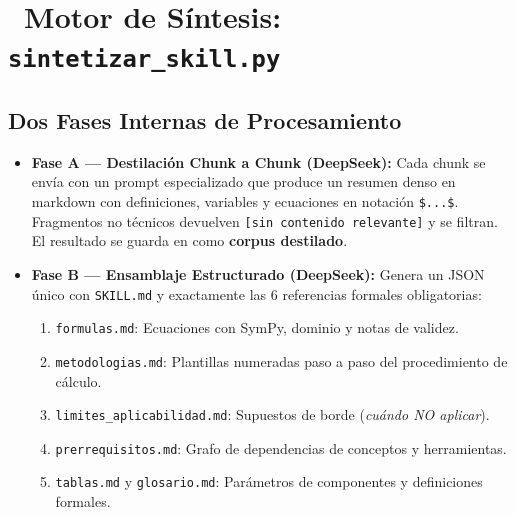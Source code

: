 \documentclass[11pt,a4paper]{article}
\newcommand{\iconotexto}[2]{\textcolor{cyanNeon}{\faIcon{#1}}~#2}
\begin{document}
\section[Motor de Síntesis sintetizar\_skill.py]{\iconotexto{microchip}{Motor de Síntesis: \texttt{sintetizar\_skill.py}}}

\subsection{Dos Fases Internas de Procesamiento}
\begin{itemize}[leftmargin=*]
     \item \textbf{Fase A --- Destilación Chunk a Chunk (DeepSeek):} Cada chunk se envía con un prompt especializado que produce un resumen denso en markdown con definiciones, variables y ecuaciones en notación \texttt{\$...\$}. Fragmentos no técnicos devuelven \texttt{[sin contenido relevante]} y se filtran. El resultado se guarda en  como \textbf{corpus destilado}.
  \item \textbf{Fase B --- Ensamblaje Estructurado (DeepSeek):} Genera un JSON único con \texttt{SKILL.md} y exactamente las 6 referencias formales obligatorias:
  \begin{enumerate}
    \item \texttt{formulas.md}: Ecuaciones con SymPy, dominio y notas de validez.
    \item \texttt{metodologias.md}: Plantillas numeradas paso a paso del procedimiento de cálculo.
    \item \texttt{limites\_aplicabilidad.md}: Supuestos de borde (\textit{cuándo NO aplicar}).
    \item \texttt{prerrequisitos.md}: Grafo de dependencias de conceptos y herramientas.
    \item \texttt{tablas.md} y \texttt{glosario.md}: Parámetros de componentes y definiciones formales.
  \end{enumerate}
\end{itemize}
\end{document}
